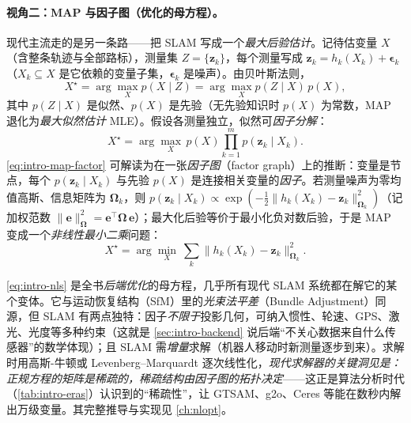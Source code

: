 \paragraph{视角二：MAP 与因子图（优化的母方程）。}
现代主流走的是另一条路——把 SLAM 写成一个\emph{最大后验估计}\cite{cadena2016past}。记待估变量 $X$（含整条轨迹与全部路标），测量集 $Z=\{\mathbf{z}_k\}$，每个测量写成 $\mathbf{z}_k=h_k(X_k)+\boldsymbol{\epsilon}_k$（$X_k\subseteq X$ 是它依赖的变量子集，$\boldsymbol{\epsilon}_k$ 是噪声）。由贝叶斯法则，
\begin{equation}
  X^\star=\arg\max_X p(X\mid Z)=\arg\max_X p(Z\mid X)\,p(X),
  \label{eq:intro-map}
\end{equation}
其中 $p(Z\mid X)$ 是似然、$p(X)$ 是先验（无先验知识时 $p(X)$ 为常数，MAP 退化为\emph{最大似然估计} MLE）。假设各测量独立，似然可\emph{因子分解}：
\begin{equation}
  X^\star=\arg\max_X\, p(X)\prod_{k=1}^{m} p(\mathbf{z}_k\mid X_k).
  \label{eq:intro-map-factor}
\end{equation}
\cref{eq:intro-map-factor} 可解读为在一张\emph{因子图}（factor graph）上的推断：变量是节点，每个 $p(\mathbf{z}_k\mid X_k)$ 与先验 $p(X)$ 是连接相关变量的\emph{因子}。若测量噪声为零均值高斯、信息矩阵为 $\boldsymbol{\Omega}_k$，则 $p(\mathbf{z}_k\mid X_k)\propto\exp(-\tfrac12\|h_k(X_k)-\mathbf{z}_k\|_{\boldsymbol{\Omega}_k}^2)$（记加权范数 $\|\mathbf{e}\|_{\boldsymbol{\Omega}}^2=\mathbf{e}^\top\boldsymbol{\Omega}\,\mathbf{e}$）；最大化后验等价于最小化负对数后验，于是 MAP 变成一个\emph{非线性最小二乘}问题：
\begin{equation}
  X^\star=\arg\min_X\ \sum_{k} \big\|h_k(X_k)-\mathbf{z}_k\big\|_{\boldsymbol{\Omega}_k}^2.
  \label{eq:intro-nls}
\end{equation}

\begin{insight}
\cref{eq:intro-nls} 是全书\emph{后端优化}的母方程，几乎所有现代 SLAM 系统都在解它的某个变体\cite{cadena2016past}。它与运动恢复结构（SfM）里的\emph{光束法平差}（Bundle Adjustment）同源，但 SLAM 有两点独特：因子\emph{不限于}投影几何，可纳入惯性、轮速、GPS、激光、光度等多种约束（这就是 \cref{sec:intro-backend} 说后端“不关心数据来自什么传感器”的数学体现）；且 SLAM 需\emph{增量}求解（机器人移动时新测量逐步到来）。求解时用高斯-牛顿或 Levenberg--Marquardt 逐次线性化，\emph{现代求解器的关键洞见是：正规方程的矩阵是稀疏的，稀疏结构由因子图的拓扑决定}——这正是算法分析时代（\cref{tab:intro-eras}）认识到的“稀疏性”，让 GTSAM、g2o、Ceres 等能在数秒内解出万级变量。其完整推导与实现见 \cref{ch:nlopt}。
\end{insight}

